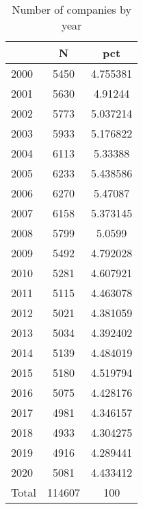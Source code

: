 \begin{table}[htbp]\centering
\caption{Number of companies by year}
\begin{tabular}{l*{1}{cc}}
\toprule
                    &           N&         pct\\
\midrule
2000                &        5450&    4.755381\\
2001                &        5630&     4.91244\\
2002                &        5773&    5.037214\\
2003                &        5933&    5.176822\\
2004                &        6113&     5.33388\\
2005                &        6233&    5.438586\\
2006                &        6270&     5.47087\\
2007                &        6158&    5.373145\\
2008                &        5799&      5.0599\\
2009                &        5492&    4.792028\\
2010                &        5281&    4.607921\\
2011                &        5115&    4.463078\\
2012                &        5021&    4.381059\\
2013                &        5034&    4.392402\\
2014                &        5139&    4.484019\\
2015                &        5180&    4.519794\\
2016                &        5075&    4.428176\\
2017                &        4981&    4.346157\\
2018                &        4933&    4.304275\\
2019                &        4916&    4.289441\\
2020                &        5081&    4.433412\\
Total               &      114607&         100\\
\bottomrule
\end{tabular}
\end{table}
